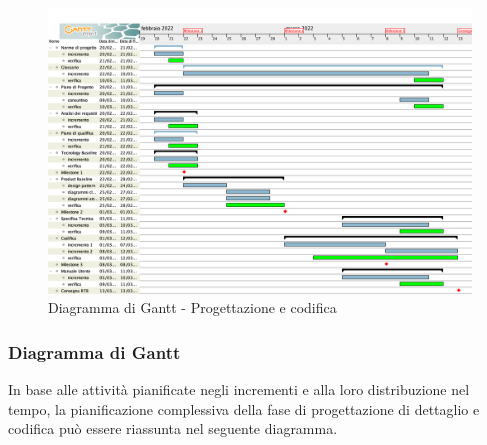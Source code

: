 \begin{figure}[H]
	\centering
	\includegraphics[scale=0.35]{Sezioni/gantt/progettazione_codifica.png}
	\caption{Diagramma di Gantt - Progettazione e codifica}
\end{figure}


\subsubsection{Diagramma di Gantt}
In base alle attività pianificate negli incrementi e alla loro distribuzione nel tempo, la pianificazione complessiva della fase di progettazione di dettaglio e codifica può essere riassunta nel seguente diagramma.




